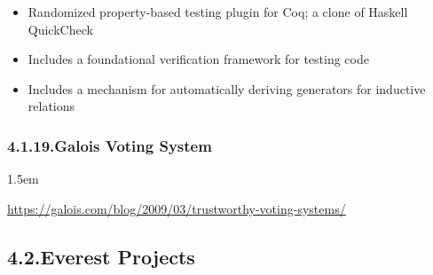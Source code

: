 \documentclass[12pt,twoside]{article}
\begin{document}
\begin{itemize}[noitemsep,topsep=\mdcompacttopsep]%

\item{}Randomized property-based testing plugin for Coq; a clone of Haskell QuickCheck%

\item{}Includes a foundational verification framework for testing code%

\item{}Includes a mechanism for automatically deriving generators for inductive relations%
\end{itemize}%

\subsubsection{4.1.19.\hspace*{0.5em}Galois Voting System}%

\begin{mddefinitions}%


\begin{mdbmarginx}{}{}{}{1.5em}%
\begin{mddefdata}%
\href{https://galois.com/blog/2009/03/trustworthy-voting-systems/}{{\ttfamily https://\hspace{0pt}galois.\hspace{0pt}com/\hspace{0pt}blog/\hspace{0pt}2009/\hspace{0pt}03/\hspace{0pt}trustworthy-\hspace{0pt}voting-\hspace{0pt}systems/\hspace{0pt}}}%
\end{mddefdata}%
\end{mdbmarginx}%
\end{mddefinitions}%

\subsection{4.2.\hspace*{0.5em}Everest Projects}%
\end{document}
